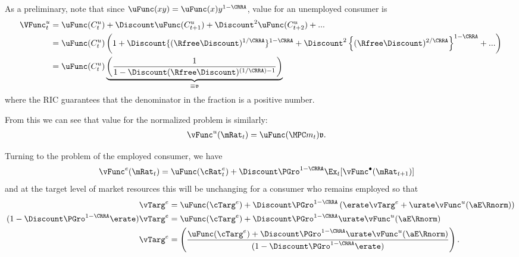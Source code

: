 \documentclass{handout}
\begin{document}
As a preliminary, note that since $\uFunc(xy)=\uFunc(x)y^{1-\CRRA}$, value for an unemployed consumer is 
\begin{equation}\begin{gathered}\begin{aligned}
  \VFunc_{t}^{u} & =  \uFunc(C_{t}^{u})+\Discount \uFunc(C_{t+1}^{u}) + \Discount^{2} \uFunc(C_{t+2}^{u})+...
\\ & =  \uFunc(C_{t}^{u})\left(1+\Discount \{(\Rfree \Discount)^{1/\CRRA}\}^{1-\CRRA} + \Discount^{2}\left\{(\Rfree \Discount)^{2/\CRRA}\right\}^{1-\CRRA}+...\right)
\\ & =  \uFunc(C_{t}^{u})\underbrace{\left(\frac{1}{1-\Discount (\Rfree \Discount)^{(1/\CRRA)-1}}\right)}_{\equiv \mathfrak{v}}
\end{aligned}\end{gathered}\end{equation}
where the RIC guarantees that the denominator in the fraction is a positive number.  

From this we can see that value for the normalized problem is similarly:
\begin{equation}\begin{gathered}\begin{aligned}
  \vFunc^{u}(\mRat_{t}) & =  \uFunc(\MPCU m_{t}) \mathfrak{v}
.
\end{aligned}\end{gathered}\end{equation}

Turning to the problem of the employed consumer, we have
\begin{equation}\begin{gathered}\begin{aligned}
  \vFunc^{e}(\mRat_{t}) & =  \uFunc({\cRat}^{e}_{t})+\Discount \PGro^{1-\CRRA} \Ex_{t}[\vFunc^{\bullet}(\mRat_{t+1})]
\end{aligned}\end{gathered}\end{equation}
and at the target level of market resources this will be unchanging for a consumer who
remains employed so that 
\begin{equation}\begin{gathered}\begin{aligned}
  \vTarg^{e} & =  \uFunc(\cTarg^{e})+\Discount \PGro^{1-\CRRA} \left(\erate \vTarg^{e} + \urate \vFunc^{u}(\aE \Rnorm)\right)
\\ (1-\Discount \PGro^{1-\CRRA} \erate) \vTarg^{e} & =  \uFunc(\cTarg^{e})+\Discount \PGro^{1-\CRRA} \urate \vFunc^{u}(\aE \Rnorm)
\\ \vTarg^{e} & =  \left(\frac{\uFunc(\cTarg^{e})+\Discount \PGro^{1-\CRRA} \urate \vFunc^{u}(\aE \Rnorm)}{(1-\Discount \PGro^{1-\CRRA} \erate) }\right)
.
\end{aligned}\end{gathered}\end{equation}
\end{document}
